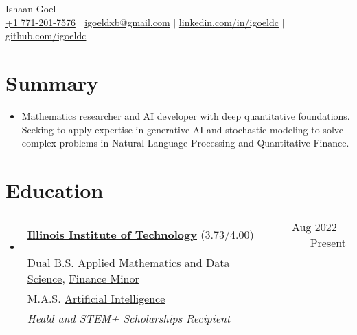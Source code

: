 \documentclass[letterpaper,10pt]{article}
\newcommand\indentsize{10pt}
\newcommand\vspacesize{-10pt}
\newcommand{\resumeSubHeadingListStart}{\begin{itemize}[leftmargin=0.15in, label=]}
\newcommand{\resumeSubHeadingListEnd}{\end{itemize}}
\begin{document}
\begin{center}
    \huge Ishaan Goel \\ \vspace{2pt}
    \large
    \href{tel:17712017576}{+1 771-201-7576}
    $|$ \href{mailto:igoeldxb@gmail.com}{igoeldxb@gmail.com}
    $|$ \href{https://linkedin.com/in/igoeldc/}{linkedin.com/in/igoeldc}
    $|$ \href{https://github.com/igoeldc}{github.com/igoeldc}
\end{center}

\section{Summary}
  \resumeSubHeadingListStart
    \item{Mathematics researcher and AI developer with deep quantitative foundations. Seeking to apply expertise in generative AI and stochastic modeling to solve complex problems in Natural Language Processing and Quantitative Finance.}
  \resumeSubHeadingListEnd
\vspace{\vspacesize}

\newcommand{\resumeEducationHeading}[6]{
  \item
    \begin{tabular*}{0.97\textwidth}[t]{l@{\extracolsep{\fill}}r}
      \textbf{#1} {#2} & #3 \\
      \hspace{\indentsize} #4 \\
      \hspace{\indentsize} #5 \\
      \hspace{20pt} \textit{#6} \\
    \end{tabular*}
}

\section{Education}
  \resumeSubHeadingListStart
    \resumeEducationHeading
      {\href{https://www.iit.edu/}{Illinois Institute of Technology}}{(3.73/4.00)}{Aug 2022 -- Present}{Dual B.S. \href{https://catalog.iit.edu/undergraduate/colleges/computing/applied-mathematics/bs/\#text}{Applied Mathematics} and \href{https://catalog.iit.edu/undergraduate/colleges/computing/computer-science/\#:~:text=The\%20B.S.\%20in\%20Data,be\%20successful\%20data\%20science\%20professionals.}{Data Science}, \href{https://catalog.iit.edu/undergraduate/colleges/business/minor-finance/\#:~:text=business\%20schools\%20worldwide.-,Required\%20Courses,-Course\%20List}{Finance Minor}}
      {M.A.S. \href{https://catalog.iit.edu/graduate/colleges/computing/computer-science/master-artificial-intelligence/\#overviewtext}{Artificial Intelligence}}{Heald and STEM+ Scholarships Recipient}
  \resumeSubHeadingListEnd
  
\end{document}
